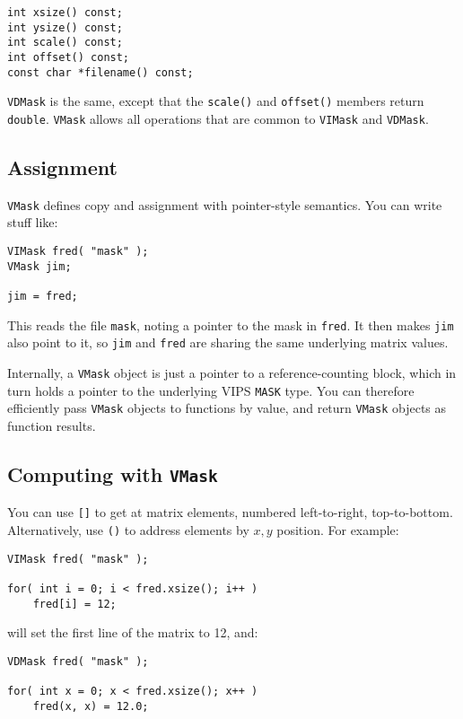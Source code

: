 \begin{verbatim}
int xsize() const;
int ysize() const;
int scale() const;
int offset() const;
const char *filename() const;
\end{verbatim}

\verb+VDMask+ is the same, except that the \verb+scale()+ and \verb+offset()+
members return \verb+double+. \verb+VMask+ allows all operations that are
common to \verb+VIMask+ and \verb+VDMask+.

\subsection{Assignment}

\verb+VMask+ defines copy and assignment with pointer-style
semantics. You can write stuff like:

\begin{verbatim}
VIMask fred( "mask" );
VMask jim;

jim = fred;
\end{verbatim}

This reads the file \verb+mask+, noting a pointer to the mask in \verb+fred+.
It then makes \verb+jim+ also point to it, so \verb+jim+ and \verb+fred+ are
sharing the same underlying matrix values.  

Internally, a \verb+VMask+ object is just a pointer to a reference-counting
block, which in turn holds a pointer to the underlying VIPS \verb+MASK+ type.
You can therefore efficiently pass \verb+VMask+ objects to functions by
value, and return \verb+VMask+ objects as function results.

\subsection{Computing with \texttt{VMask}}

You can use \verb+[]+ to get at matrix elements, numbered left-to-right,
top-to-bottom. Alternatively, use \verb+()+ to address elements by $x,y$
position. For example:

\begin{verbatim}
VIMask fred( "mask" );

for( int i = 0; i < fred.xsize(); i++ )
    fred[i] = 12;
\end{verbatim}

\noindent
will set the first line of the matrix to 12, and:

\begin{verbatim}
VDMask fred( "mask" );

for( int x = 0; x < fred.xsize(); x++ )
    fred(x, x) = 12.0;
\end{verbatim}

